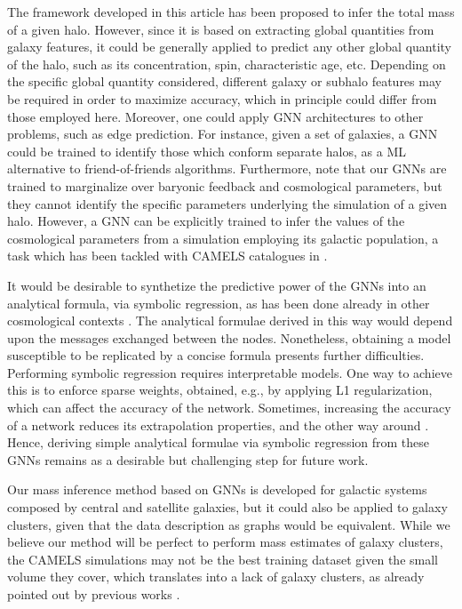 \documentclass[twocolumn]{aastex631}
\begin{document}
The framework developed in this article has been proposed to infer the total mass of a given halo. However, since it is based on extracting global quantities from galaxy features, it could be generally applied to predict any other global quantity of the halo, such as its concentration, spin, characteristic age, etc. Depending on the specific global quantity considered, different galaxy or subhalo features may be required in order to maximize accuracy, which in principle could differ from those employed here. Moreover, one could apply GNN architectures to other problems, such as edge prediction. For instance, given a set of galaxies, a GNN could be trained to identify those which conform separate halos, as a ML alternative to friend-of-friends algorithms. Furthermore, note that our GNNs are trained to marginalize over baryonic feedback and cosmological parameters, but they cannot identify the specific parameters underlying the simulation of a given halo. However, a GNN can be explicitly trained to infer the values of the cosmological parameters from a simulation employing its galactic population, a task which has been tackled with CAMELS catalogues in \cite{2022arXiv220413713V}.

It would be desirable to synthetize the predictive power of the GNNs into an analytical formula, via symbolic regression, as has been done already in other cosmological contexts \citep{2019arXiv190905862C, Cranmer:2020wew, Shao:2021qoa, Wadekar_2020}. The analytical formulae derived in this way would depend upon the messages exchanged between the nodes. Nonetheless, obtaining a model susceptible to be replicated by a concise formula presents further difficulties. Performing symbolic regression requires interpretable models. One way to achieve this is to enforce sparse weights, obtained, e.g., by applying L1 regularization, which can affect the accuracy of the network. Sometimes, increasing the accuracy of a network reduces its extrapolation properties, and the other way around \citep{Shao:2021qoa}. Hence, deriving simple analytical formulae via symbolic regression from these GNNs remains as a desirable but challenging step for future work.

Our mass inference method based on GNNs is developed for galactic systems composed by central and satellite galaxies, but it could also be applied to galaxy clusters, given that the data description as graphs would be equivalent. While we believe our method will be perfect to perform mass estimates of galaxy clusters, the CAMELS simulations may not be the best training dataset given the small volume they cover, which translates into a lack of galaxy clusters, as already pointed out by previous works \cite{2022arXiv220101305W}.
\end{document}
